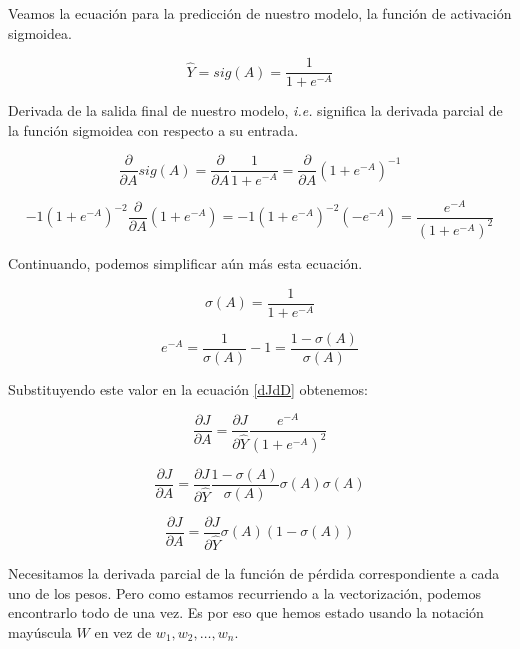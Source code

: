 \documentclass[a4paper,12pt]{article}
\begin{document}
Veamos la ecuación para la predicción de nuestro modelo, la función de activación sigmoidea.

\begin{equation}
	\hat{Y} = sig(A) = \frac{1}{1+e^{-A}}
\end{equation}

Derivada de la salida final de nuestro modelo, \textit{i.e.} significa la derivada parcial de la función sigmoidea con respecto a su entrada.

\begin{equation}
	\frac{\partial}{\partial A} sig(A) = \frac{\partial}{\partial A} \frac{1}{1+e^{-A}} = \frac{\partial}{\partial A} (1+e^{-A})^{-1}
\end{equation}

\begin{equation}
	-1  (1+e^{-A})^{-2} \frac{\partial}{\partial A} (1+e^{-A}) = -1  (1+e^{-A})^{-2} (-e^{-A}) = \frac{e^{-A}}{(1+e^{-A})^2}
\end{equation}

Continuando, podemos simplificar aún más esta ecuación.

\begin{equation}
	\sigma(A) = \frac{1}{1+e^{-A}}
\end{equation}

\begin{equation}
	e^{-A} = \frac{1}{\sigma(A)} - 1 = \frac{1-\sigma(A)}{\sigma(A)}
\end{equation}

Substituyendo este valor en la ecuación \ref{dJdD} obtenemos:

\begin{equation}
	\frac{\partial J}{\partial A} = \frac{\partial J}{\partial \hat{Y}} \frac{e^{-A}}{(1+e^{-A})^2}
\end{equation}

\begin{equation}
	\frac{\partial J}{\partial A} = \frac{\partial J} {\partial \hat{Y} } \frac{1-\sigma(A)}{\sigma(A)} \sigma(A) \sigma(A)
\end{equation}

\begin{equation}
	\frac{\partial J}{\partial A} = \frac{\partial J} {\partial \hat{Y}} \sigma(A) (1-\sigma(A))
\end{equation}

Necesitamos la derivada parcial de la función de pérdida correspondiente a cada uno de los pesos. Pero como estamos recurriendo a la vectorización, podemos encontrarlo todo de una vez. Es por eso que hemos estado usando la notación mayúscula $W$ en vez de $w_1, w_2, \ldots, w_n$.
\end{document}
